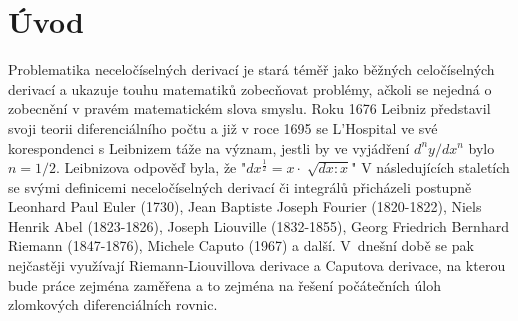 \documentclass[a4paper,12pt,twoside]{article}
\theoremstyle{definition}
\theoremstyle{remark}
\numberwithin{equation}{section}
\numberwithin{table}{section}
\numberwithin{figure}{section}
\begin{document}
\newpage
\pagestyle{fancy}
\setlength{\headheight}{13.78807pt}
\renewcommand{\headrulewidth}{0.4pt}
\renewcommand{\sectionmark}[1]{\markboth{\thesection~  #1}{} }
\fancyhead[LO,RE]{\small\textit{\nouppercase{\leftmark}}}
\fancyhead[LE,RO]{\small\thepage}
\fancyfoot[LE,RO]{\empty}
\fancyfoot[CE,CO]{\empty}


\newpage
\tableofcontents
\newpage


\section{Úvod}

Problematika neceločíselných derivací je stará téměř jako běžných celočíselných derivací a ukazuje touhu matematiků zobecňovat problémy, ačkoli se nejedná o zobecnění v pravém matematickém slova smyslu. Roku 1676 Leibniz představil svoji teorii diferenciálního počtu a již v roce 1695 se L'Hospital ve své korespondenci s Leibnizem táže na význam, jestli by ve vyjádření
$ {d^{n}y}/{dx^{n}} $
bylo $n = 1/2$. Leibnizova odpověď byla, že "$dx^{\frac{1}{2}} = x \cdot \sqrt[]{dx :x}$"
V následujících staletích se svými definicemi neceločíselných derivací či integrálů přicházeli postupně Leonhard Paul Euler (1730), Jean Baptiste Joseph Fourier (1820-1822), Niels Henrik Abel (1823-1826), Joseph Liouville (1832-1855), Georg Friedrich Bernhard Riemann  (1847-1876), Michele Caputo (1967)  a další. 
V~dnešní době se pak nejčastěji využívají Riemann-Liouvillova derivace a Caputova derivace, na kterou bude práce zejména zaměřena a to zejména na řešení počátečních úloh zlomkových diferenciálních rovnic. 
\end{document}
